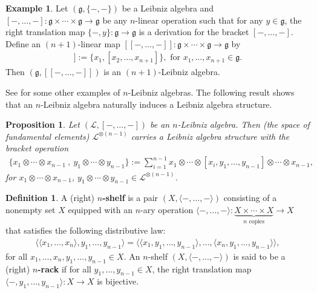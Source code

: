 \documentclass[a4paper,reqno,10pt]{amsart}
\theoremstyle{plain}
\newtheorem{prop}[thm]{Proposition}
\theoremstyle{definition}
\newtheorem{defn}[thm]{Definition}
\newtheorem{exam}[thm]{Example}
\theoremstyle{remark}
\begin{document}
\begin{exam}
    Let $(\mathfrak{g}, \{ -, - \})$ be a Leibniz algebra and $[-, \ldots, -] : \mathfrak{g} \times \cdots \times \mathfrak{g} \rightarrow \mathfrak{g}$ be any $n$-linear operation such that for any $y \in \mathfrak{g}$, the right translation map $\{ -, y \} : \mathfrak{g} \rightarrow \mathfrak{g}$ is a derivation for the bracket $[-, \ldots, - ]$. Define an $(n+1)$-linear map $[ \! \! [ -, \ldots, - ] \! \! ] : \mathfrak{g} \times \cdots \times \mathfrak{g} \rightarrow \mathfrak{g}$ by
    \begin{align*}
        [ \! \! [ x_1, \ldots, x_{n+1} ] \! \! ] := \{ x_1, [x_2, \ldots, x_{n+1}]\}, \text{ for } x_1, \ldots, x_{n+1} \in \mathfrak{g}.
    \end{align*}
    Then $(\mathfrak{g}, [ \! \! [ -, \ldots, - ] \! \! ])$ is an $(n+1)$-Leibniz algebra.
\end{exam}

See \cite{casas1, casas3} for some other examples of $n$-Leibniz algebras. The following result \cite[Proposition 3.4]{casas1} shows that an $n$-Leibniz algebra naturally induces a Leibniz algebra structure.

\begin{prop} \label{funda-leibniz}
    Let $(\mathcal{L}, [-, \ldots, -])$ be an $n$-Leibniz algebra. Then (the space of fundamental elements) $\mathcal{L}^{\otimes (n-1)}$ carries a Leibniz algebra structure with the bracket operation 
    \begin{align}\label{funda-leib-bracket}
        \{ x_1 \otimes \cdots \otimes x_{n-1} ~ \! , ~ \! y_1 \otimes \cdots \otimes y_{n-1} \} := \sum_{i=1}^{n-1} x_1 \otimes \cdots \otimes [ x_i, y_1, \ldots, y_{n-1}] \otimes \cdots \otimes x_{n-1},
    \end{align}
    for $x_1 \otimes \cdots \otimes x_{n-1}$, $y_1 \otimes \cdots \otimes y_{n-1} \in \mathcal{L}^{\otimes (n-1)}$.
\end{prop}

\medskip

\begin{defn} \cite{biyog}
    A (right) {\bf $n$-shelf} is a pair $(X, \langle - , \ldots, - \rangle)$ consisting of a nonempty set $X$ equipped with an $n$-ary operation $\langle - , \ldots, - \rangle : \underbrace{X \times \cdots \times X}_{n \text{ copies}} \rightarrow X$ that satisfies the following distributive law:
    \begin{align}\label{n-shelf}
         \langle \langle x_1, \ldots, x_n \rangle, y_1, \ldots, y_{n-1} \rangle = \langle \langle x_1,  y_1, \ldots, y_{n-1} \rangle , \ldots, \langle x_n,  y_1, \ldots, y_{n-1} \rangle \rangle,
    \end{align}
    for all $x_1, \ldots, x_n, y_1, \ldots, y_{n-1} \in X$. An $n$-shelf $(X, \langle - , \ldots, - \rangle)$ is said to be a (right) {\bf $n$-rack} if for all $y_1, \ldots, y_{n-1} \in X$, the right translation map $\langle -,  y_1, \ldots, y_{n-1} \rangle : X \rightarrow X$ is bijective.
\end{defn}
\end{document}
